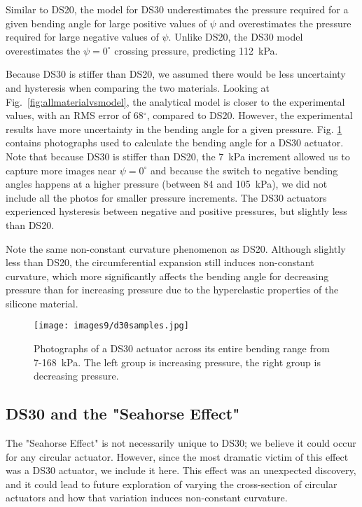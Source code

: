 Similar to DS20, the model for DS30 underestimates the pressure required for a given bending angle for large positive values of $\psi$ and overestimates the pressure required for large negative values of $\psi$. Unlike DS20, the DS30 model overestimates the $\psi=0^\circ$ crossing pressure, predicting 112~kPa. 

Because DS30 is stiffer than DS20, we assumed there would be less uncertainty and hysteresis when comparing the two materials. Looking at Fig.~\ref{fig:allmaterialvsmodel}, the analytical model is closer to the experimental values, with an RMS error of 68$^\circ$, compared to DS20. However, the experimental results have more uncertainty in the bending angle for a given pressure. Fig. \ref{fig:d30samples} contains photographs used to calculate the bending angle for a DS30 actuator. Note that because DS30 is stiffer than DS20, the 7~kPa increment allowed us to capture more images near $\psi=0^\circ$ and because the switch to negative bending angles happens at a higher pressure (between 84 and 105~kPa), we did not include all the photos for smaller pressure increments. The DS30 actuators experienced hysteresis between negative and positive pressures, but slightly less than DS20. 

Note the same non-constant curvature phenomenon as DS20. Although slightly less than DS20, the circumferential expansion still induces non-constant curvature, which more significantly affects the bending angle for decreasing pressure than for increasing pressure due to the hyperelastic properties of the silicone material. 

\begin{figure}[ht]
    \centering
     \texttt{[image: images9/d30samples.jpg]}
    \caption{Photographs of a DS30 actuator across its entire bending range from 7-168~kPa. The left group is increasing pressure, the right group is decreasing pressure.}
    \label{fig:d30samples}
\end{figure}

\subsection{DS30 and the "Seahorse Effect"}

The "Seahorse Effect" is not necessarily unique to DS30; we believe it could occur for any circular actuator. However, since the most dramatic victim of this effect was a DS30 actuator, we include it here. This effect was an unexpected discovery, and it could lead to future exploration of varying the cross-section of circular actuators and how that variation induces non-constant curvature. 

